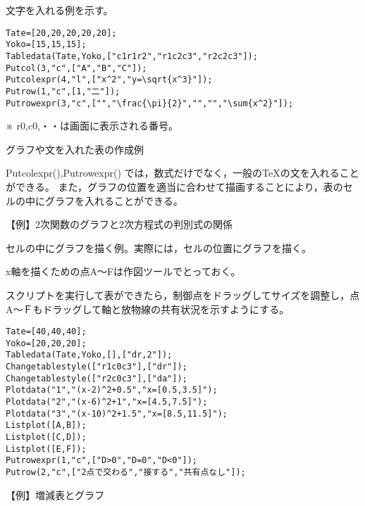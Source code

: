 \documentclass[papersize,a4paper,10pt,uplatex]{jsarticle}
\begin{document}
\begin{description}
文字を入れる例を示す。
\begin{verbatim}
Tate=[20,20,20,20,20];
Yoko=[15,15,15];
Tabledata(Tate,Yoko,["c1r1r2","r1c2c3","r2c2c3"]);
Putcol(3,"c",["A","B","C"]);
Putcolexpr(4,"l",["x^2","y=\sqrt{x^3}"]);
Putrow(1,"c",[1,"二"]);
Putrowexpr(3,"c",["","\frac{\pi}{2}","","","\sum{x^2}"]);
\end{verbatim}
 \vspace{\baselineskip}
\begin{center}  \end{center}

※ r0,c0,・・は画面に表示される番号。

グラフや文を入れた表の作成例

Putcolexpr(),Putrowexpr() では，数式だけでなく，一般の\TeX の文を入れることができる。
また，グラフの位置を適当に合わせて描画することにより，表のセルの中にグラフを入れることができる。

\vspace{\baselineskip}
【例】2次関数のグラフと2次方程式の判別式の関係

セルの中にグラフを描く例。実際には，セルの位置にグラフを描く。

x軸を描くための点A〜Fは作図ツールでとっておく。

スクリプトを実行して表ができたら，制御点をドラッグしてサイズを調整し，点A〜Ｆもドラッグして軸と放物線の共有状況を示すようにする。

\vspace{\baselineskip}
\begin{verbatim}
Tate=[40,40,40];
Yoko=[20,20,20];
Tabledata(Tate,Yoko,[],["dr,2"]);
Changetablestyle(["r1c0c3"],["dr"]);
Changetablestyle(["r2c0c3"],["da"]);
Plotdata("1","(x-2)^2+0.5","x=[0.5,3.5]");
Plotdata("2","(x-6)^2+1","x=[4.5,7.5]");
Plotdata("3","(x-10)^2+1.5","x=[8.5,11.5]");
Listplot([A,B]);
Listplot([C,D]);
Listplot([E,F]);
Putrowexpr(1,"c",["D>0","D=0","D<0"]);
Putrow(2,"c",["2点で交わる","接する","共有点なし"]);
\end{verbatim}

\vspace{\baselineskip}
 \begin{center}\scalebox{0.9}{ } \end{center}


\vspace{\baselineskip}
【例】増減表とグラフ


\end{description}
\end{document}
